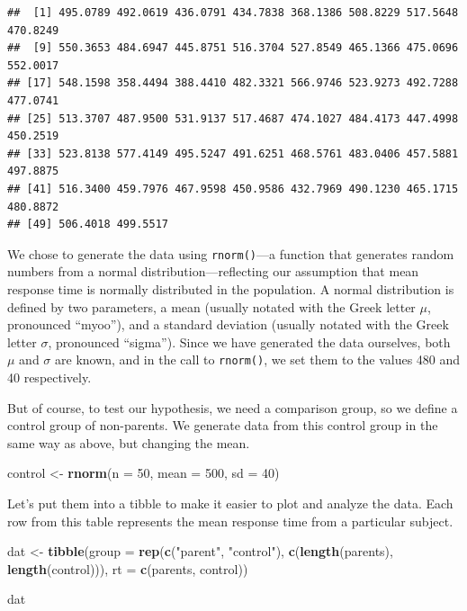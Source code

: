 \documentclass[]{book}
\newenvironment{Shaded}{\begin{snugshade}}{\end{snugshade}}
\newcommand{\DataTypeTok}[1]{\textcolor[rgb]{0.13,0.29,0.53}{#1}}
\newcommand{\DecValTok}[1]{\textcolor[rgb]{0.00,0.00,0.81}{#1}}
\newcommand{\KeywordTok}[1]{\textcolor[rgb]{0.13,0.29,0.53}{\textbf{#1}}}
\newcommand{\NormalTok}[1]{#1}
\newcommand{\StringTok}[1]{\textcolor[rgb]{0.31,0.60,0.02}{#1}}
\begin{document}
\begin{verbatim}
##  [1] 495.0789 492.0619 436.0791 434.7838 368.1386 508.8229 517.5648 470.8249
##  [9] 550.3653 484.6947 445.8751 516.3704 527.8549 465.1366 475.0696 552.0017
## [17] 548.1598 358.4494 388.4410 482.3321 566.9746 523.9273 492.7288 477.0741
## [25] 513.3707 487.9500 531.9137 517.4687 474.1027 484.4173 447.4998 450.2519
## [33] 523.8138 577.4149 495.5247 491.6251 468.5761 483.0406 457.5881 497.8875
## [41] 516.3400 459.7976 467.9598 450.9586 432.7969 490.1230 465.1715 480.8872
## [49] 506.4018 499.5517
\end{verbatim}

We chose to generate the data using \texttt{rnorm()}---a function that generates random numbers from a normal distribution---reflecting our assumption that mean response time is normally distributed in the population. A normal distribution is defined by two parameters, a mean (usually notated with the Greek letter \(\mu\), pronounced ``myoo''), and a standard deviation (usually notated with the Greek letter \(\sigma\), pronounced ``sigma''). Since we have generated the data ourselves, both \(\mu\) and \(\sigma\) are known, and in the call to \texttt{rnorm()}, we set them to the values 480 and 40 respectively.

But of course, to test our hypothesis, we need a comparison group, so we define a control group of non-parents. We generate data from this control group in the same way as above, but changing the mean.

\begin{Shaded}
\begin{Highlighting}[]
\NormalTok{control <-}\StringTok{ }\KeywordTok{rnorm}\NormalTok{(}\DataTypeTok{n =} \DecValTok{50}\NormalTok{, }\DataTypeTok{mean =} \DecValTok{500}\NormalTok{, }\DataTypeTok{sd =} \DecValTok{40}\NormalTok{)}
\end{Highlighting}
\end{Shaded}

Let's put them into a tibble to make it easier to plot and analyze the data. Each row from this table represents the mean response time from a particular subject.

\begin{Shaded}
\begin{Highlighting}[]
\NormalTok{dat <-}\StringTok{ }\KeywordTok{tibble}\NormalTok{(}\DataTypeTok{group =} \KeywordTok{rep}\NormalTok{(}\KeywordTok{c}\NormalTok{(}\StringTok{"parent"}\NormalTok{, }\StringTok{"control"}\NormalTok{), }\KeywordTok{c}\NormalTok{(}\KeywordTok{length}\NormalTok{(parents), }\KeywordTok{length}\NormalTok{(control))),}
              \DataTypeTok{rt =} \KeywordTok{c}\NormalTok{(parents, control))}

\NormalTok{dat}
\end{Highlighting}
\end{Shaded}
\end{document}
